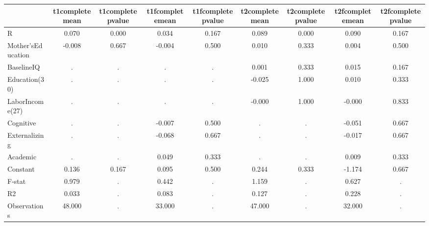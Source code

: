 \begin{table}[htbp]
\begin{tabular}{lcccccccc} \hline \hline
 & t1completemean  & t1completepvalue  & t1fcompletemean  & t1fcompletepvalue  & t2completemean  & t2completepvalue  & t2fcompletemean  & t2fcompletepvalue  \\  \hline 
R &     0.070 &     0.000 &     0.034 &     0.167 &     0.089 &     0.000 &     0.090 &     0.167 \\  
Mother'sEducation &    -0.008 &     0.667 &    -0.004 &     0.500 &     0.010 &     0.333 &     0.004 &     0.500 \\  
BaselineIQ &         . &         . &         . &         . &     0.001 &     0.333 &     0.015 &     0.167 \\  
Education(30) &         . &         . &         . &         . &    -0.025 &     1.000 &     0.010 &     0.333 \\  
LaborIncome(27) &         . &         . &         . &         . &    -0.000 &     1.000 &    -0.000 &     0.833 \\  
Cognitive &         . &         . &    -0.007 &     0.500 &         . &         . &    -0.051 &     0.667 \\  
Externalizing &         . &         . &    -0.068 &     0.667 &         . &         . &    -0.017 &     0.667 \\  
Academic &         . &         . &     0.049 &     0.333 &         . &         . &     0.009 &     0.333 \\  
Constant &     0.136 &     0.167 &     0.095 &     0.500 &     0.244 &     0.333 &    -1.174 &     0.667 \\  
F-stat &     0.979 &         . &     0.442 &         . &     1.159 &         . &     0.627 &         . \\  
R2 &     0.033 &         . &     0.083 &         . &     0.127 &         . &     0.228 &         . \\  
Observations &    48.000 &         . &    33.000 &         . &    47.000 &         . &    32.000 &         . \\  
\hline \hline \end{tabular}
\end{table}
